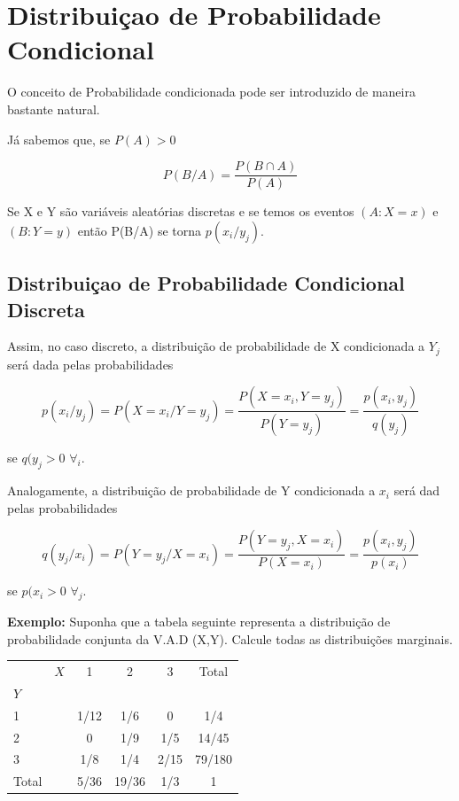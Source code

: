 \documentclass[a4paper,12pt]{report}
\begin{document}
{\section{Distribuiçao de Probabilidade Condicional}


O conceito de Probabilidade condicionada pode ser introduzido de
maneira bastante natural.\vskip0.3cm

Já sabemos que, se $P(A)>0$

$$
P(B/A)=\frac{P(B\cap A)}{P(A)}
$$

Se X e Y são variáveis aleatórias discretas e se temos os eventos
$(A:X=x)$ e $(B:Y=y)$ então P(B/A) se torna
$p(x_{i}/y_{j})$.\vskip0.3cm


\subsection{Distribuiçao de Probabilidade Condicional Discreta}

Assim, no caso discreto, a distribuição de probabilidade de X
condicionada a $Y_{j}$ será dada pelas probabilidades


\begin{equation}\label{}
    p(x_{i}/y_{j}) =
    P(X=x_{i}/Y=y_{j})=\frac{P(X=x_{i},Y=y_{j})}{P(Y=y_{j})}=\frac{p(x_{i},y_{j})}{q(y_{j})}
\end{equation}

se $q(y_{j}>0 $ $\forall_{i}$. \vskip0.3cm

Analogamente, a distribuição de probabilidade de Y condicionada a
$x_{i}$ será dad pelas probabilidades


\begin{equation}\label{}
    q(y_{j}/x_{i}) =
    P(Y=y_{j}/X=x_{i})=\frac{P(Y=y_{j},X=x_{i})}{P(X=x_{i})}=\frac{p(x_{i},y_{j})}{p(x_{i})}
\end{equation}


se $p(x_{i}>0 $ $\forall_{j}$. \vskip0.3cm




\textbf{Exemplo:} Suponha que a tabela seguinte representa a
distribuição de probabilidade conjunta da V.A.D (X,Y). Calcule
todas as distribuições marginais.

\begin{table}[!htp]
\centering
\begin{tabular}{lr|ccc|c}
\hline\hline
      & $X$ & 1    & 2     & 3    & Total \\
%
  $Y$ &     &      &       &      &  \\
 \hline
  1   &     & 1/12 & 1/6   & 0    & 1/4 \\
%
  2   &     & 0    & 1/9   & 1/5  & 14/45 \\
%
  3   &     & 1/8  & 1/4   & 2/15 & 79/180 \\ \hline
%
Total &     & 5/36 & 19/36 & 1/3  & 1 \\ \hline
\end{tabular}
\end{table}

}
\end{document}
